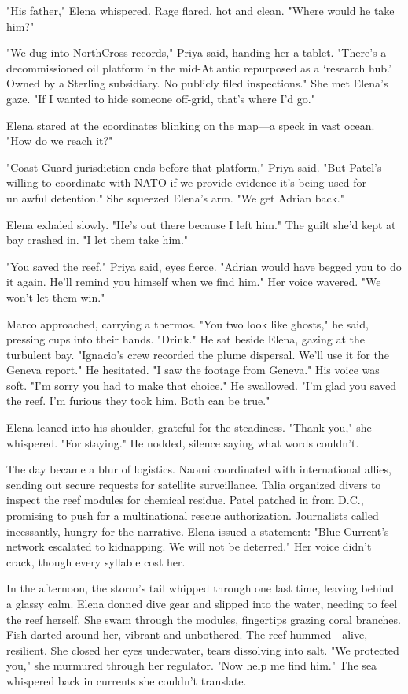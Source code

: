 "His father," Elena whispered. Rage flared, hot and clean. "Where would he take him?"

"We dug into NorthCross records," Priya said, handing her a tablet. "There's a decommissioned oil platform in the mid-Atlantic repurposed as a `research hub.' Owned by a Sterling subsidiary. No publicly filed inspections." She met Elena's gaze. "If I wanted to hide someone off-grid, that's where I'd go."

Elena stared at the coordinates blinking on the map—a speck in vast ocean. "How do we reach it?"

"Coast Guard jurisdiction ends before that platform," Priya said. "But Patel's willing to coordinate with NATO if we provide evidence it's being used for unlawful detention." She squeezed Elena's arm. "We get Adrian back."

Elena exhaled slowly. "He's out there because I left him." The guilt she'd kept at bay crashed in. "I let them take him."

"You saved the reef," Priya said, eyes fierce. "Adrian would have begged you to do it again. He'll remind you himself when we find him." Her voice wavered. "We won't let them win."

Marco approached, carrying a thermos. "You two look like ghosts," he said, pressing cups into their hands. "Drink." He sat beside Elena, gazing at the turbulent bay. "Ignacio's crew recorded the plume dispersal. We'll use it for the Geneva report." He hesitated. "I saw the footage from Geneva." His voice was soft. "I'm sorry you had to make that choice." He swallowed. "I'm glad you saved the reef. I'm furious they took him. Both can be true."

Elena leaned into his shoulder, grateful for the steadiness. "Thank you," she whispered. "For staying." He nodded, silence saying what words couldn't.

The day became a blur of logistics. Naomi coordinated with international allies, sending out secure requests for satellite surveillance. Talia organized divers to inspect the reef modules for chemical residue. Patel patched in from D.C., promising to push for a multinational rescue authorization. Journalists called incessantly, hungry for the narrative. Elena issued a statement: "Blue Current's network escalated to kidnapping. We will not be deterred." Her voice didn't crack, though every syllable cost her.

In the afternoon, the storm's tail whipped through one last time, leaving behind a glassy calm. Elena donned dive gear and slipped into the water, needing to feel the reef herself. She swam through the modules, fingertips grazing coral branches. Fish darted around her, vibrant and unbothered. The reef hummed—alive, resilient. She closed her eyes underwater, tears dissolving into salt. "We protected you," she murmured through her regulator. "Now help me find him." The sea whispered back in currents she couldn't translate.

